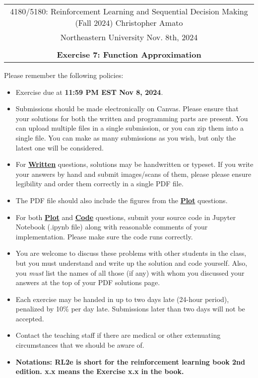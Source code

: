 \documentclass{article}
\begin{document}
\begin{center}
	\begin{tabular}{|c|}
		\hline
		4180/5180: Reinforcement Learning and Sequential Decision Making (Fall 2024) \hspace{1cm} Christopher Amato \\
		Northeastern University \hfill  Nov. 8th, 2024                                                    \\\\
		{\bfseries \large Exercise 7: Function Approximation}                                    \\ \hline
	\end{tabular}
\end{center}


Please remember the following policies:
\begin{itemize}
	\item Exercise due at \textbf{11:59 PM EST Nov 8, 2024}.
	\item Submissions should be made electronically on Canvas. Please ensure that your solutions for both the written and programming parts are present. You can upload multiple files in a single submission, or you can zip them into a single file. You can make as many submissions as you wish, but only the latest one will be considered.
	\item For \uline{\textbf{Written}} questions, solutions may be handwritten or typeset. If you write your answers by hand and submit images/scans of them, please please ensure legibility and order them correctly in a single PDF file.
	\item The PDF file should also include the figures from the \uline{\textbf{Plot}} questions.
	\item For both \uline{\textbf{Plot}} and \uline{\textbf{Code}} questions, submit your source code in Jupyter Notebook (.ipynb file) along with reasonable comments of your implementation. Please make sure the code runs correctly. 
	\item You are welcome to discuss these problems with other students in the class, but you must understand and write up the solution and code yourself. Also, you \textit{must} list the names of all those (if any) with whom you discussed your answers at the top of your PDF solutions page.
	\item Each exercise may be handed in up to two days late (24-hour period), penalized by 10\% per day late. Submissions later than two days will not be accepted.
	\item Contact the teaching staff if there are medical or other extenuating circumstances that we should be aware of.
	\item \textbf{Notations: RL2e is short for the reinforcement learning book 2nd edition. x.x means the Exercise x.x in the book.}
\end{itemize}
\end{document}
